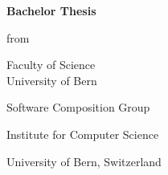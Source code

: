 \begin{titlepage}  
  \begin{center}  
  
  \begin{figure}[t]  
  \vspace*{-2cm}        %
  \vspace{1in}     
  \end{figure}

    \thispagestyle{empty}
    
    {\bfseries\Huge \thesistitle \par
    \Large \vspace{0.1in} \thesissubtitle \par}

    \vspace{0.3in} 
    \LARGE{\textbf{Bachelor Thesis} \\}
    \vspace{0.4in}

    {\Large \thesisauthor \par from \par \thesisauthorOrigin}
    
    \vspace{0.3in}
    {\Large Faculty of Science \\
            University of Bern \par}
    \vspace{0.3in}
    {\Large \thesisdate \par}
    \vspace{0.3in}
   {\Large \thesisleiter} \par
      {\Large \thesisasst} \par
   \vspace{0.1in}
    {\Large Software Composition Group \par Institute for Computer Science \par University of Bern, Switzerland \par}
  


\end{center}
\end{titlepage}
